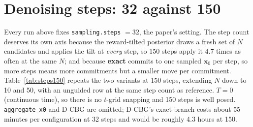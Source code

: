 \documentclass[11pt]{article}
\begin{document}
\section{Denoising steps: 32 against 150}
\label{sec:steps}

Every run above fixes \texttt{sampling.steps} $= 32$, the paper's setting. The
step count deserves its own axis because the reward-tilted posterior draws a
fresh set of $N$ candidates and applies the tilt at \emph{every} step, so 150
steps apply it 4.7 times as often at the same $N$; and because \textbf{exact}
commits to one sampled $\mathbf{x}_0$ per step, so more steps means more
commitments but a smaller move per commitment. Table~\ref{tab:steps150} repeats
the two variants at 150 steps, extending $N$ down to 10 and 50, with an unguided
row at the same step count as reference. $T = 0$ (continuous time), so there is
no $t$-grid snapping and 150 steps is well posed. \texttt{aggregate\_x0} and
D-CBG are omitted; D-CBG's exact branch costs about 55 minutes per configuration
at 32 steps and would be roughly 4.3 hours at 150.
\end{document}
